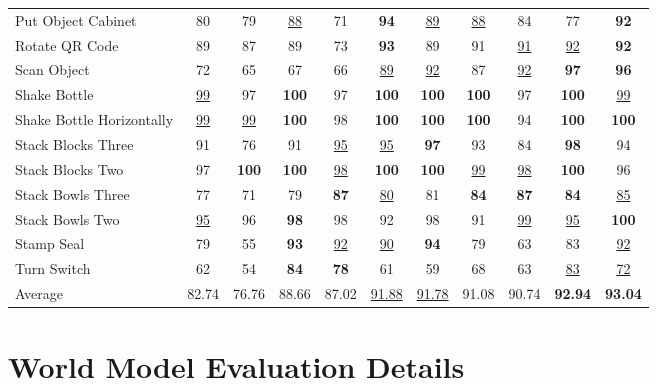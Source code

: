 \begin{center}
\begin{minipage}{\linewidth}
\begin{tabular*}{\linewidth}{@{\extracolsep{\fill}}l*{10}{c}@{}}
        Put Object Cabinet & 80 & 79 & \underline{88} & 71 & \textbf{94} & \underline{89} & \underline{88} & 84 & 77 & \textbf{92} \\
        Rotate QR Code & 89 & 87 & 89 & 73 & \textbf{93} & 89 & 91 & \underline{91} & \underline{92} & \textbf{92} \\
        Scan Object & 72 & 65 & 67 & 66 & \underline{89} & \underline{92} & 87 & \underline{92} & \textbf{97} & \textbf{96} \\
        Shake Bottle & \underline{99} & 97 & \textbf{100} & 97 & \textbf{100} & \textbf{100} & \textbf{100} & 97 & \textbf{100} & \underline{99} \\
        Shake Bottle Horizontally & \underline{99} & \underline{99} & \textbf{100} & 98 & \textbf{100} & \textbf{100} & \textbf{100} & 94 & \textbf{100} & \textbf{100} \\
        Stack Blocks Three & 91 & 76 & 91 & \underline{95} & \underline{95} & \textbf{97} & 93 & 84 & \textbf{98} & 94 \\
        Stack Blocks Two & 97 & \textbf{100} & \textbf{100} & \underline{98} & \textbf{100} & \textbf{100} & \underline{99} & \underline{98} & \textbf{100} & 96 \\
        Stack Bowls Three & 77 & 71 & 79 & \textbf{87} & \underline{80} & 81 & \textbf{84} & \textbf{87} & \textbf{84} & \underline{85} \\
        Stack Bowls Two & \underline{95} & 96 & \textbf{98} & 98 & 92 & 98 & 91 & \underline{99} & \underline{95} & \textbf{100} \\
        Stamp Seal & 79 & 55 & \textbf{93} & \underline{92} & \underline{90} & \textbf{94} & 79 & 63 & 83 & \underline{92} \\
        Turn Switch & 62 & 54 & \textbf{84} & \textbf{78} & 61 & 59 & 68 & 63 & \underline{83} & \underline{72} \\
        \midrule
        Average & 82.74 & 76.76 & 88.66 & 87.02 & \underline{91.88} & \underline{91.78} & 91.08 & 90.74 & \textbf{92.94} & \textbf{93.04} \\
        \bottomrule
    \end{tabular*}
\end{minipage}
\end{center}

\section{World Model Evaluation Details}
\label{app:world_model_protocol}

